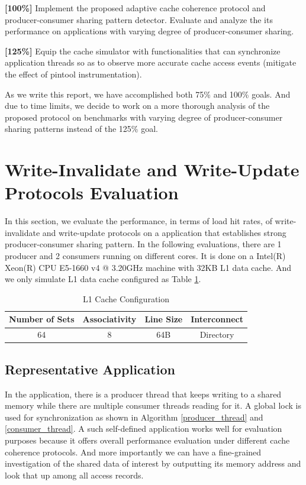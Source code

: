 \documentclass[11pt,conference]{IEEEtran}
\begin{document}
\textbf{[100\%]} Implement the proposed adaptive cache coherence protocol and producer-consumer sharing pattern detector. Evaluate and analyze the its performance on applications with varying degree of producer-consumer sharing.

\textbf{[125\%]} Equip the cache simulator with functionalities that can synchronize application threads so as to observe more accurate cache access events (mitigate the effect of pintool instrumentation).

As we write this report, we have accomplished both 75\% and 100\% goals. And due to time limits, we decide to work on a more thorough analysis of the proposed protocol on benchmarks with varying degree of producer-consumer sharing patterns instead of the 125\% goal.


\section{Write-Invalidate and Write-Update Protocols Evaluation}
In this section, we evaluate the performance, in terms of load hit rates, of write-invalidate and write-update protocols on a application that establishes strong producer-consumer sharing pattern. In the following evaluations, there are 1 producer and 2 consumers running on different cores. It is done on a Intel(R) Xeon(R) CPU E5-1660 v4 @ 3.20GHz machine with 32KB L1 data cache. And we only simulate L1 data cache configured as Table \ref{l1_cache_config_1}.

\begin{table}[!h]
\renewcommand{\arraystretch}{2.5}
\caption{L1 Cache Configuration}
\label{l1_cache_config_1}
\centering
\begin{tabular}{|c|c|c|c|}
\hline
Number of Sets & Associativity & Line Size & Interconnect \\
\hline
64 & 8 & 64B & Directory \\
\hline
\end{tabular}
\end{table}
\FloatBarrier

\subsection{Representative Application}
In the application, there is a producer thread that keeps writing to a shared memory while there are multiple consumer threads reading for it. A global lock is used for synchronization as shown in Algorithm \ref{producer_thread} and \ref{consumer_thread}. A such self-defined application works well for evaluation purposes because it offers overall performance evaluation under different cache coherence protocols. And more importantly we can have a fine-grained investigation of the shared data of interest by outputting its memory address and look that up among all access records.
\end{document}
